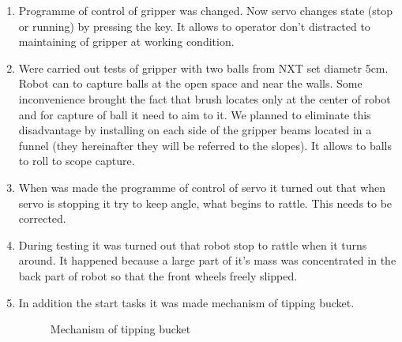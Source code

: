 \begin{enumerate}
\begin{enumerate}
      \item Programme of control of gripper was changed. Now servo changes state (stop or running) by pressing the key. It allows to operator don't distracted to maintaining of gripper at working condition.   
      
      \item Were carried out tests of gripper with two balls from NXT set diametr 5cm. Robot can to capture balls at the open space and near the walls. Some inconvenience brought the fact that brush locates only at the center of robot and for capture of ball it need to aim to it. We planned to eliminate this disadvantage by installing on each side of the gripper beams located in a funnel (they hereinafter they will be referred to the slopes). It allows to balls to roll to scope capture.
      
      \item When was made the programme of control of servo it turned out that when servo is stopping it try to keep angle, what begins to rattle. This needs to be corrected.
      
      \item During testing it was turned out that robot stop to rattle when it turns around. It happened because a large part of it's mass was concentrated in the back part of robot so that the front wheels freely slipped.
      
      \item In addition the start tasks it was made mechanism of tipping bucket.
      
      \begin{figure}[H]
      	\begin{minipage}[h]{1\linewidth}
      		\caption{Mechanism of tipping bucket}
      	\end{minipage}
      \end{figure}
      

\end{enumerate}
\end{enumerate}
